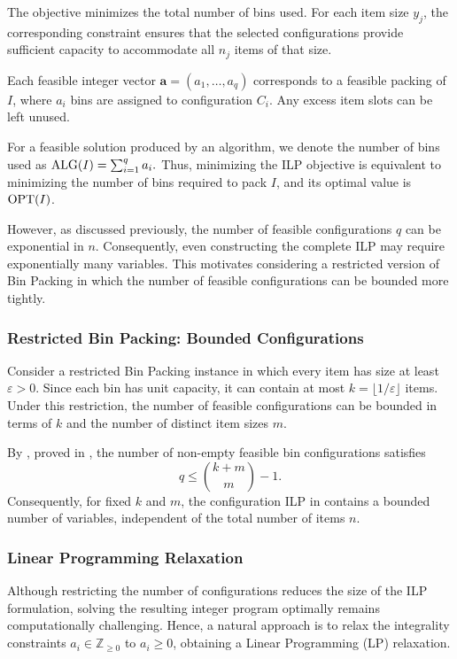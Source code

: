 The objective minimizes the total number of
bins used. For each item size $y_j$, the
corresponding constraint ensures that the
selected configurations provide sufficient
capacity to accommodate all $n_j$ items of
that size.

Each feasible integer vector
$\mathbf{a}=(a_1,\ldots,a_q)$ corresponds to
a feasible packing of $I$, where $a_i$ bins
are assigned to configuration $C_i$.
Any excess item slots can be left unused.

For a feasible solution produced by an algorithm,
we denote the number of bins used as
$\operatorname{ALG}(I)=\sum_{i=1}^{q}a_i.$
Thus, minimizing the ILP objective is equivalent
to minimizing the number of bins required to pack
$I$, and its optimal value is $\operatorname{OPT}(I)$.

However, as discussed previously, the number of
feasible configurations $q$ can be exponential
in $n$. Consequently, even constructing the
complete ILP may require exponentially many
variables. This motivates considering a restricted version
of Bin Packing in which the number of feasible
configurations can be bounded more tightly.


\subsubsection{Restricted Bin Packing: Bounded Configurations}
\label{subsubsec:bounded-config}

Consider a restricted Bin Packing instance in which
every item has size at least $\varepsilon>0$.
Since each bin has unit capacity, it can contain
at most $k=\lfloor 1/\varepsilon\rfloor$ items. Under this restriction, the number of feasible
configurations can be bounded in terms of $k$
and the number of distinct item sizes $m$.

By , proved in
, the number of non-empty
feasible bin configurations satisfies
\[
    q\leq \binom{k+m}{m}-1.
\]
Consequently, for fixed $k$ and $m$, the configuration
ILP in 
contains a bounded number of variables,
independent of the total number of items $n$.


\subsubsection{Linear Programming Relaxation}
\label{subsubsec:bp-lp}

Although restricting the number of configurations
reduces the size of the ILP formulation, solving
the resulting integer program optimally remains
computationally challenging. Hence, a natural approach is to relax the integrality constraints $a_i \in \mathbb{Z}_{\geq 0}$ to $a_i \geq 0$, obtaining a Linear Programming
(LP) relaxation.

